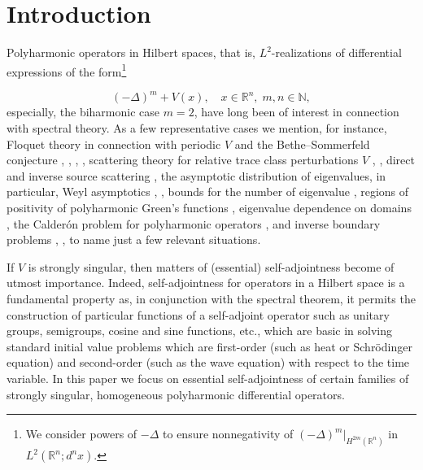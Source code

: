 \documentclass[reqno,11pt,centertags]{amsart}
\newcommand{\bbN}{{\mathbb{N}}}
\newcommand{\bbR}{{\mathbb{R}}}
\newcommand{\<}{\langle}
\renewcommand{\>}{\rangle}
\newcommand{\lb}{\label}
\numberwithin{equation}{section}
\theoremstyle{definition}
\begin{document}
\maketitle
 
\section{Introduction} \lb{s1}

Polyharmonic operators in Hilbert spaces, that is, $L^2$-realizations of differential expressions of the form\footnote{We consider powers of $-\Delta$ to ensure nonnegativity of $(-\Delta)^m\big|_{H^{2m}(\bbR^n)}$ in $L^2(\bbR^n;d^nx)$.}

\begin{equation}
(-\Delta)^m + V(x), \quad x \in \bbR^n, \; m, n \in \bbN, 
\end{equation}
especially, the biharmonic case $m=2$, have long been of interest in connection with spectral theory. As a few representative cases we mention, for instance, Floquet theory in connection with periodic $V$ and the Bethe--Sommerfeld conjecture \cite[Chs.~2--4]{Ka97}, \cite{PS01}, \cite{PS01a}, \cite{PS10}, scattering theory for relative trace class perturbations $V$ \cite{Pu99}, \cite[Sect.~3.4]{Ya10}, direct and inverse source scattering \cite{Zh25}, the asymptotic distribution of eigenvalues, in particular, Weyl asymptotics  \cite{Li16}, \cite[Ch.~1]{SV97}, bounds for the number of eigenvalue \cite{Hu18}, regions of positivity of polyharmonic Green's functions \cite{GS07}, eigenvalue dependence on domains \cite{BL13}, the Calder{\' o}n problem for polyharmonic operators \cite{SS23}, and inverse boundary problems \cite{KLU12}, \cite{KU16}, to name just a few relevant situations. 

If $V$ is strongly singular, then matters of (essential) self-adjointness become of utmost importance. Indeed,  
self-adjointness for operators in a Hilbert space is a fundamental property as, in conjunction with the spectral theorem, it permits the construction of particular functions of a self-adjoint operator such as unitary groups, semigroups, cosine and sine functions, etc., which are basic in solving standard initial value problems which are first-order (such as heat or Schr\"odinger equation) and second-order (such as the wave equation) with respect to the  time variable. In this paper we focus on essential self-adjointness of certain families of strongly singular, homogeneous polyharmonic differential operators. 
\end{document}
